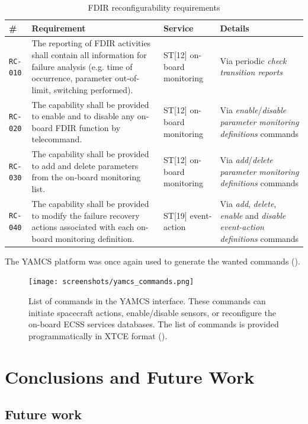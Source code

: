 \documentclass[a4paper,nobib]{tufte-book}
\begin{document}
\begin{table}[h]
	\centering
	\caption{\ac{FDIR} reconfigurability requirements}
	\label{tab:fdir-recon-rq}
	\begin{tabularx}{\textwidth}{@{}lXlL{4cm}@{}}
		\toprule
 		\# & Requirement & Service & Details \\ \midrule
		\texttt{RC-010} & The reporting of FDIR activities shall contain all information for failure analysis (e.g. time of occurrence, parameter out‐of‐limit, switching performed). & ST[12] on-board monitoring & Via periodic \emph{check transition reports} \\
		\texttt{RC-020} & The capability shall be provided to enable and to disable any on‐board FDIR function by telecommand. & ST[12] on-board monitoring & Via \emph{enable}/\emph{disable} \emph{parameter monitoring definitions} commands  \\
		\texttt{RC-030} & The capability shall be provided to add and delete parameters from the on‐board monitoring list. & ST[12] on-board monitoring & Via \emph{add}/\emph{delete} \emph{parameter monitoring definitions} commands  \\
		\texttt{RC-040} & The capability shall be provided to modify the failure recovery actions associated with each on-board monitoring definition. & ST[19] event-action & Via \emph{add}, \emph{delete}, \emph{enable} and \emph{disable} \emph{event-action definitions} commands \\ \bottomrule
	\end{tabularx}
\end{table}

The \ac{YAMCS} platform was once again used to generate the wanted commands ().

\begin{figure}[h]
	\texttt{[image: screenshots/yamcs\_commands.png]}
	\caption{List of commands in the \acs{YAMCS} interface. These commands can initiate spacecraft actions, enable/disable sensors, or reconfigure the on-board \acs{ECSS} services databases. The list of commands is provided programmatically in \ac{XTCE} format ().}
	\label{fig:yamcs_commands}
\end{figure}





\chapter{Conclusions and Future Work}


\section{Future work}

\appendix

\begin{fullwidth}
\printbibliography[heading=bibnumbered]
\end{fullwidth}


\printindex
\end{document}

